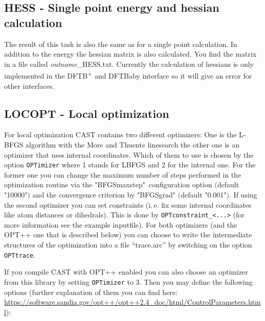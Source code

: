 \documentclass[10pt,a4paper]{article} %
\begin{document}
	\subsection{HESS - Single point energy and hessian calculation}
	The result of this task is also the same as for a single point calculation. In addition to the energy the hessian matrix is also calculated. You find the matrix in a file called \textit{outname}\_HESS.txt. Currently the calculation of hessians is only implemented in the DFTB\textsuperscript{+} and DFTBaby interface so it will give an error for other interfaces.
	

	\subsection{LOCOPT - Local optimization}
	\label{sec:locopt}
	
	For local optimization CAST contains two different optimizers: One is the   L-BFGS algorithm\supercite{bfgs} with the More and Thuente linesearch\supercite{morethuente} the other one is an optimizer that uses internal coordinates. Which of them to use is chosen by the option \texttt{OPTimizer} where 1 stands for LBFGS and 2 for the internal one. For the former one you can change the maximum number of steps performed in the optimization routine via the "BFGSmaxstep"\ configuration option $($default "10000"$)$ and the convergence criterion by "BFGSgrad" $($default "0.001"$)$. If using the second optimizer you can set constraints (i.\,e. fix some internal coordinates like atom distances or dihedrals). This is done by \texttt{OPTconstraint\_<...>} (for more information see the example inputfile). For both optimizers (and the OPT++ one that is described below) you can choose to write the intermediate structures of the optimization into a file ``trace.arc'' by switching on the option \texttt{OPTtrace}.
	
	If you compile CAST with OPT++\supercite{noauthor_opt++:_nodate} enabled you can also choose an optimizer from this library by setting \texttt{OPTimizer} to 3. Then you may define the following options (further explanation of them you can find here: \url{https://software.sandia.gov/opt++/opt++2.4_doc/html/ControlParameters.html}):
	
\end{document}
